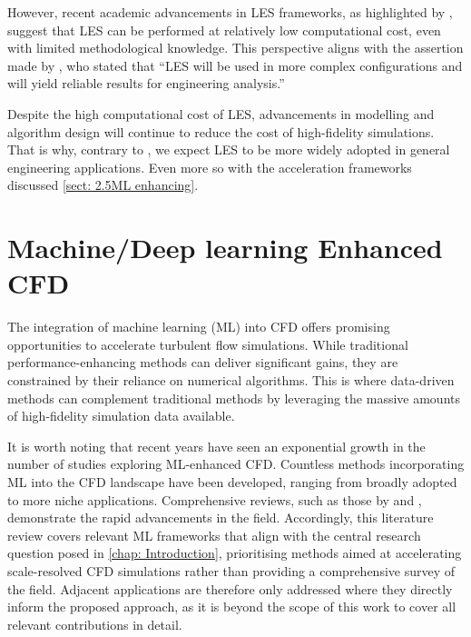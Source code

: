 However, recent academic advancements in LES frameworks, as highlighted by \textcite{Weymouth2025}, suggest that LES can be performed at relatively low computational cost, even with limited methodological knowledge. This perspective aligns with the assertion made by \textcite{Piomelli2014}, who stated that “LES will be used in more complex configurations and will yield reliable results for engineering analysis.”

Despite the high computational cost of LES, advancements in modelling and algorithm design will continue to reduce the cost of high-fidelity simulations. That is why, contrary to \textcite{Zhiyin2015}, we expect LES to be more widely adopted in general engineering applications. Even more so with the acceleration frameworks discussed  \autoref{sect: 2.5ML enhancing}.

\section{Machine/Deep learning Enhanced CFD}
\label{sect: 2.5ML enhancing}
The integration of machine learning (ML) into CFD offers promising opportunities to accelerate turbulent flow simulations. While traditional performance-enhancing methods can deliver significant gains, they are constrained by their reliance on numerical algorithms. This is where data-driven methods can complement traditional methods by leveraging the massive amounts of high-fidelity simulation data available. 





It is worth noting that recent years have seen an exponential growth in the number of studies exploring ML-enhanced CFD. Countless methods incorporating ML into the CFD landscape have been developed, ranging from broadly adopted to more niche applications. Comprehensive reviews, such as those by \textcite{Vinuesa2022} and \textcite{Wang2024}, demonstrate the rapid advancements in the field. Accordingly, this literature review covers relevant ML frameworks that align with the central research question posed in \autoref{chap: Introduction}, prioritising methods aimed at accelerating scale-resolved CFD simulations rather than providing a comprehensive survey of the field. Adjacent applications are therefore only addressed where they directly inform the proposed approach, as it is beyond the scope of this work to cover all relevant contributions in detail.


